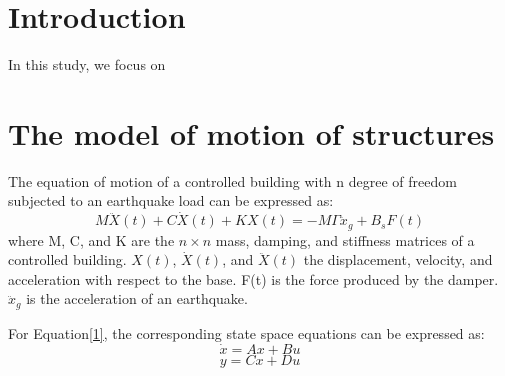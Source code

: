 

\date{Received: date / Accepted: date}


\maketitle


\begin{abstract}





\end{abstract}

\section{Introduction}
In this study, we focus on 
\section{The model of motion of structures}
The equation of motion of a controlled building with n degree of freedom subjected to an earthquake load can be expressed as:
\begin{equation}M\ddot{X}(t)+C\dot{X}(t)+KX(t)=-M\Gamma\ddot{x}_g+B_sF(t)\end{equation}\label{1}
where M, C, and K are the $n \times n$  mass, damping, and stiffness matrices of a controlled building. $X(t)$, $\dot{X}(t)$, and $\ddot{X}(t)$ the displacement, velocity, and acceleration with respect to the base.
F(t) is the force produced by the damper. $\ddot{x}_g$ is the acceleration of an earthquake. 

For Equation\ref{1}, the corresponding state space equations can be expressed as:
\begin{equation}\dot{x}=Ax+Bu\end{equation}
\begin{equation}y=Cx+Du\end{equation}

